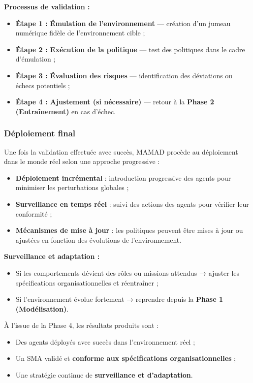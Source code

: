 \documentclass[pdflatex,sn-mathphys-num]{sn-jnl}%
\theoremstyle{thmstyleone}%
\theoremstyle{thmstyletwo}%
\theoremstyle{thmstylethree}%
\begin{document}
\vspace{0.4em}
\noindent \textbf{Processus de validation :}
\begin{itemize}
    \item \textbf{Étape 1 : Émulation de l'environnement} — création d'un jumeau numérique fidèle de l'environnement cible ;
    \item \textbf{Étape 2 : Exécution de la politique} — test des politiques dans le cadre d'émulation ;
    \item \textbf{Étape 3 : Évaluation des risques} — identification des déviations ou échecs potentiels ;
    \item \textbf{Étape 4 : Ajustement (si nécessaire)} — retour à la \textbf{Phase 2 (Entraînement)} en cas d'échec.
\end{itemize}

\subsubsection{Déploiement final}

Une fois la validation effectuée avec succès, MAMAD procède au déploiement dans le monde réel selon une approche progressive :

\begin{itemize}
    \item \textbf{Déploiement incrémental} : introduction progressive des agents pour minimiser les perturbations globales ;
    \item \textbf{Surveillance en temps réel} : suivi des actions des agents pour vérifier leur conformité ;
    \item \textbf{Mécanismes de mise à jour} : les politiques peuvent être mises à jour ou ajustées en fonction des évolutions de l'environnement.
\end{itemize}

\vspace{0.4em}
\noindent \textbf{Surveillance et adaptation :}
\begin{itemize}
    \item Si les comportements dévient des rôles ou missions attendus → ajuster les spécifications organisationnelles et réentraîner ;
    \item Si l'environnement évolue fortement → reprendre depuis la \textbf{Phase 1 (Modélisation)}.
\end{itemize}

\vspace{0.4em}
\noindent À l'issue de la Phase 4, les résultats produits sont :
\begin{itemize}
    \item Des agents déployés avec succès dans l'environnement réel ;
    \item Un SMA validé et \textbf{conforme aux spécifications organisationnelles} ;
    \item Une stratégie continue de \textbf{surveillance et d'adaptation}.
\end{itemize}
\end{document}

